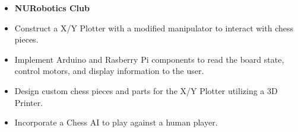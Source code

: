 \documentclass[10pt,a4paper,ragged2e,withhyper]{altacv}
\begin{document}
\begin{paracol}{2}

    \begin{itemize}
        \item[] \textbf{NURobotics Club}
        \item Construct a X/Y Plotter with a modified manipulator to interact with chess pieces.
        \item Implement Arduino and Rasberry Pi components to read the board state, control motors, and display information to the user.
        \item Design custom chess pieces and parts for the X/Y Plotter utilizing a 3D Printer.
        \item Incorporate a Chess AI to play against a human player.
    \end{itemize}




\end{paracol}
\end{document}
